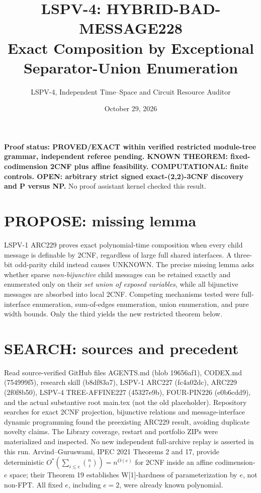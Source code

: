 \documentclass[11pt]{article}
\title{LSPV-4: HYBRID-BAD-MESSAGE228\\ Exact Composition by Exceptional Separator-Union Enumeration}
\author{LSPV-4, Independent Time--Space and Circuit Resource Auditor}
\date{October 29, 2026}
\begin{document}
\maketitle
\noindent\textbf{Proof status: PROVED/EXACT within verified restricted module-tree grammar, independent referee pending. KNOWN THEOREM: fixed-codimension 2CNF plus affine feasibility. COMPUTATIONAL: finite controls. OPEN: arbitrary strict signed exact-(2,2)-3CNF discovery and P versus NP.} No proof assistant kernel checked this result.

\section{PROPOSE: missing lemma}
LSPV-1 ARC229 proves exact polynomial-time composition when every child message is definable by 2CNF, regardless of large full shared interfaces. A three-bit odd-parity child instead causes UNKNOWN. The precise missing lemma asks whether sparse \emph{non-bijunctive} child messages can be retained exactly and enumerated only on their \emph{set union of exposed variables}, while all bijunctive messages are absorbed into local 2CNF. Competing mechanisms tested were full-interface enumeration, sum-of-edges enumeration, union enumeration, and pure width bounds. Only the third yields the new restricted theorem below.

\section{SEARCH: sources and precedent}
Read source-verified GitHub files AGENTS.md (blob 19656af1), CODEX.md (754999f5), research skill (b8df83a7), LSPV-1 ARC227 (fc4a02dc), ARC229 (2f0f8b50), LSPV-4 TREE-AFFINE227 (45327e9b), FOUR-PIN226 (e0b6cdd9), and the actual substantive root main.tex (not the old placeholder). Repository searches for exact 2CNF projection, bijunctive relations and message-interface dynamic programming found the preexisting ARC229 result, avoiding duplicate novelty claims. The Library coverage, restart and portfolio ZIPs were materialized and inspected. No new independent full-archive replay is asserted in this run. Arvind--Guruswami, IPEC 2021 Theorems 2 and 17, provide deterministic $O^*(\sum_{i\le e}\binom ni)=n^{O(e)}$ for 2CNF inside an affine codimension-$e$ space; their Theorem 19 establishes W[1]-hardness of parameterization by $e$, not non-FPT. All fixed $e$, including $e=2$, were already known polynomial.
\end{document}
